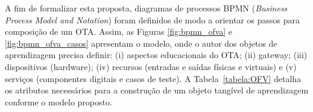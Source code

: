 A fim de formalizar esta proposta, diagramas de processos BPMN (\textit{Business Process Model and Notation}) foram definidos de modo a orientar os passos para composição de um OTA. Assim, as Figuras \ref{fig:bpmn_ofva} e \ref{fig:bpmn_ofva_casos} apresentam o modelo, onde o autor dos objetos de aprendizagem precisa definir: (i) aspectos educacionais do OTA; (ii) gateway; (iii) dispositivos (hardware); (iv) recursos (entradas e saídas físicas e virtuais) e (v) serviços (componentes digitais e casos de teste). A Tabela~\ref{tabela:OFV} detalha os atributos necessários para a construção de um objeto tangível de aprendizagem conforme o modelo proposto.



